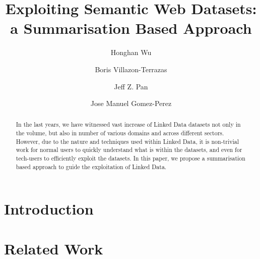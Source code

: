 \documentclass{llncs}
\begin{document}
%
\frontmatter          %
%
\pagestyle{headings}  %
%
%
\mainmatter              %
%
\title{Exploiting Semantic Web Datasets: a Summarisation Based Approach}

%
%
\author{Honghan Wu \and Boris Villazon-Terrazas \and Jeff Z. Pan \and Jose Manuel Gomez-Perez}
%
%
%


\maketitle              %



\begin{abstract}
In the last years, we have witnessed vast increase of Linked Data datasets not only in the volume, but also in number of various domains and across different sectors. However, due to the nature and techniques used within Linked Data, it is non-trivial work for normal users to quickly understand what is within the datasets, and even for tech-users to efficiently exploit the datasets. In this paper, we propose a summarisation based approach to guide the exploitation of Linked Data. 
\end{abstract}

\vspace{-8mm}
\section{Introduction}\label{sec:Introduction}

\vspace{-8mm}
\section{Related Work}\label{sec:RelatedWork}

\end{document}
